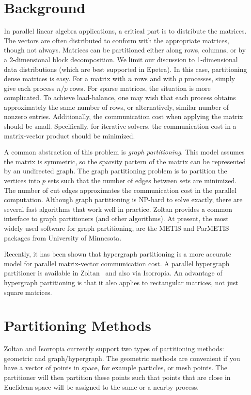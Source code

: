 \section{Background}
In parallel linear algebra applications, a critical part is to 
distribute the matrices. The vectors are often distributed to conform
with the appropriate matrices, though not always. Matrices can
be partitioned either along rows, columns, or by a 2-dimensional
block decomposition. We limit our discussion to 1-dimensional data
distributions (which are best supported in Epetra). In this case, 
partitioning dense matrices is easy.
For a matrix with $n$ rows and with $p$ processes, simply give
each process $n/p$  rows. For sparse matrices, the situation
is more complicated. To achieve load-balance, one may wish 
that each process obtains approximately the same number of rows,
or alternatively, similar number of nonzero entries. 
Additionally, the communication cost when applying the matrix
should be small. Specifically, for iterative solvers, the
communication cost in a matrix-vector product should be minimized.

A common abstraction of this problem is \emph{graph partitioning}.
This model assumes the matrix is symmetric, so the sparsity 
pattern of the matrix can be represented by an undirected graph.
The graph partitioning problem is to partition the
vertices into $p$ sets such that the number of edges between
sets are minimized. The number of cut edges approximates the
communication cost in the parallel computation. Although 
graph partitioning is NP-hard to solve exactly, there are
several fast algorithms that work well in practice. Zoltan
provides a common interface to graph partitioners (and other algorithms).
At present, the most widely used software for graph partitioning,
are the METIS and ParMETIS \cite{Metis,KarypisK99} packages from University 
of Minnesota.

Recently, it has been shown \cite{CatAyk99} that hypergraph partitioning 
is a more accurate model for parallel matrix-vector communication cost.
A parallel hypergraph partitioner is available in Zoltan~\cite{Zoltan-hypergraph} and also via Isorropia.
An advantage of hypergraph partitioning is that it
also applies to rectangular matrices, not just square matrices.

\section{Partitioning Methods}
\label{sec:methods}
Zoltan and Isorropia currently support two types of partitioning methods: geometric and graph/hypergraph. The geometric methods are convenient if you have a vector of points in space, for example particles, or mesh points. The partitioner will then partition these points such that points that are close in Euclidean space will be assigned to the same or a nearby process. 

